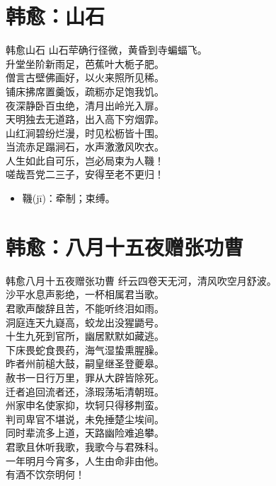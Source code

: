 \documentclass[12pt,oneside,a5paper]{book}
\begin{document}
\chapter{韩愈：山石}
\begin{poemzh}{韩愈}{山石}
山石荦确行径微，黄昏到寺蝙蝠飞。\\
升堂坐阶新雨足，芭蕉叶大栀子肥。\\
僧言古壁佛画好，以火来照所见稀。\\
铺床拂席置羹饭，疏粝亦足饱我饥。\\
夜深静卧百虫绝，清月出岭光入扉。\\
天明独去无道路，出入高下穷烟霏。\\
山红涧碧纷烂漫，时见松枥皆十围。\\
当流赤足蹋涧石，水声激激风吹衣。\\
人生如此自可乐，岂必局束为人鞿！\\
嗟哉吾党二三子，安得至老不更归！\\ 
\end{poemzh}

\begin{itemize}
\item 鞿(jī)：牵制；束缚。
\end{itemize}

\chapter{韩愈：八月十五夜赠张功曹}
\begin{poemzh}{韩愈}{八月十五夜赠张功曹}
纤云四卷天无河，清风吹空月舒波。\\
沙平水息声影绝，一杯相属君当歌。\\
君歌声酸辞且苦，不能听终泪如雨。\\
洞庭连天九嶷高，蛟龙出没猩鼯号。\\
十生九死到官所，幽居默默如藏逃。\\
下床畏蛇食畏药，海气湿蛰熏腥臊。\\
昨者州前槌大鼓，嗣皇继圣登夔皋。\\
赦书一日行万里，罪从大辟皆除死。\\
迁者追回流者还，涤瑕荡垢清朝班。\\
州家申名使家抑，坎轲只得移荆蛮。\\
判司卑官不堪说，未免捶楚尘埃间。\\
同时辈流多上道，天路幽险难追攀。\\
君歌且休听我歌，我歌今与君殊科。\\
一年明月今宵多，人生由命非由他。\\
有酒不饮奈明何！\\ 
\end{poemzh}
\end{document}
